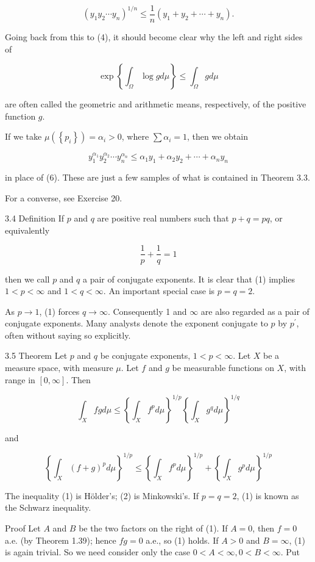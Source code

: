 \documentclass[10pt]{article}
\begin{document}
$$
\left(y_{1} y_{2} \cdots y_{n}\right)^{1 / n} \leq \frac{1}{n}\left(y_{1}+y_{2}+\cdots+y_{n}\right) .
$$

Going back from this to (4), it should become clear why the left and right sides of

$$
\exp \left\{\int_{\Omega} \log g d \mu\right\} \leq \int_{\Omega} g d \mu
$$

are often called the geometric and arithmetic means, respectively, of the positive function $g$.

If we take $\mu\left(\left\{p_{i}\right\}\right)=\alpha_{i}>0$, where $\sum \alpha_{i}=1$, then we obtain

$$
y_{1}^{\alpha_{1}} y_{2}^{\alpha_{2}} \cdots y_{n}^{\alpha_{n}} \leq \alpha_{1} y_{1}+\alpha_{2} y_{2}+\cdots+\alpha_{n} y_{n}
$$

in place of (6). These are just a few samples of what is contained in Theorem 3.3.

For a converse, see Exercise 20.

3.4 Definition If $p$ and $q$ are positive real numbers such that $p+q=p q$, or equivalently

$$
\frac{1}{p}+\frac{1}{q}=1
$$

then we call $p$ and $q$ a pair of conjugate exponents. It is clear that (1) implies $1<p<\infty$ and $1<q<\infty$. An important special case is $p=q=2$.

As $p \rightarrow 1$, (1) forces $q \rightarrow \infty$. Consequently 1 and $\infty$ are also regarded as a pair of conjugate exponents. Many analysts denote the exponent conjugate to $p$ by $p^{\prime}$, often without saying so explicitly.

3.5 Theorem Let $p$ and $q$ be conjugate exponents, $1<p<\infty$. Let $X$ be a measure space, with measure $\mu$. Let $f$ and $g$ be measurable functions on $X$, with range in $[0, \infty]$. Then

$$
\int_{X} f g d \mu \leq\left\{\int_{X} f^{p} d \mu\right\}^{1 / p}\left\{\int_{X} g^{q} d \mu\right\}^{1 / q}
$$

and

$$
\left\{\int_{X}(f+g)^{p} d \mu\right\}^{1 / p} \leq\left\{\int_{X} f^{p} d \mu\right\}^{1 / p}+\left\{\int_{X} g^{p} d \mu\right\}^{1 / p}
$$

The inequality (1) is Hölder's; (2) is Minkowski's. If $p=q=2$, (1) is known as the Schwarz inequality.

Proof Let $A$ and $B$ be the two factors on the right of (1). If $A=0$, then $f=0$ a.e. (by Theorem 1.39); hence $f g=0$ a.e., so (1) holds. If $A>0$ and $B=\infty$, (1) is again trivial. So we need consider only the case $0<A<\infty, 0<B<\infty$. Put
\end{document}
